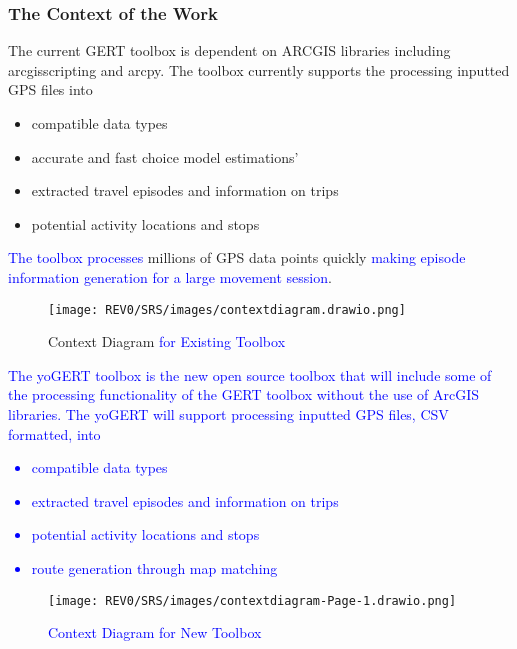 \documentclass[12pt, titlepage]{article}
\begin{document}
\subsubsection{The Context of the Work}
The current GERT toolbox is dependent on ARCGIS libraries including arcgisscripting and arcpy. The toolbox currently supports the processing inputted GPS files into
\begin{itemize}
    \item compatible data types
    \item accurate and fast choice model estimations'
    \item extracted travel episodes and information on trips
    \item potential activity locations and stops
\end{itemize}
\textcolor{blue}{The toolbox processes} millions of GPS data points quickly \textcolor{blue}{making episode information generation for a large movement session}.

\begin{figure}[!h]
	    \begin{center}
    	    \texttt{[image: REV0/SRS/images/contextdiagram.drawio.png]}
    	    \caption{Context Diagram \textcolor{blue}{for Existing Toolbox}}
    	    \label{fig: Context Diagram}
    	\end{center}
\end{figure}

\textcolor{blue}{The yoGERT toolbox is the new open source toolbox that will include some of the processing functionality of the GERT toolbox without the use of ArcGIS libraries. The yoGERT will support processing inputted GPS files, CSV formatted, into
\begin{itemize}
    \item compatible data types
    \item extracted travel episodes and information on trips
    \item potential activity locations and stops
    \item route generation through map matching
\end{itemize}}

\begin{figure}[!h]
	    \begin{center}
    	    \texttt{[image: REV0/SRS/images/contextdiagram-Page-1.drawio.png]}
    	    \caption{\textcolor{blue}{Context Diagram for New Toolbox}}
    	    \label{fig: Context Diagram}
    	\end{center}
\end{figure}
\end{document}

